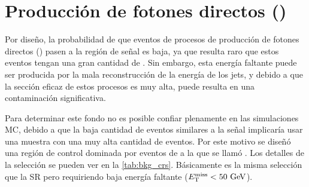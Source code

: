 \section{Producción de fotones directos (\gjet)}
\label{sec:bkg_gjet}

Por diseño, la probabilidad de que eventos de procesos de producción de fotones
directos ({\gjet}) pasen a la región de señal es
baja, ya que resulta raro que estos eventos tengan una gran cantidad de {\met}.
Sin embargo, esta energía faltante puede ser producida por la mala
reconstrucción de la energía de los jets, y debido a que la sección eficaz de
estos procesos es muy alta, puede resulta en una contaminación significativa.

Para determinar este fondo no es posible confiar plenamente en las simulaciones
MC, debido a que la baja cantidad de eventos similares a la señal implicaría
usar una muestra con una muy alta cantidad de eventos. Por este motivo se diseñó
una región de control dominada por eventos de {\gjet} a la que se llamó {\CRQ}.
Los detalles de la selección se pueden ver en la \cref{tab:bkg_crs}. Básicamente
es la misma selección que la SR pero requiriendo baja energía faltante ($\met <
50 \gev$).



